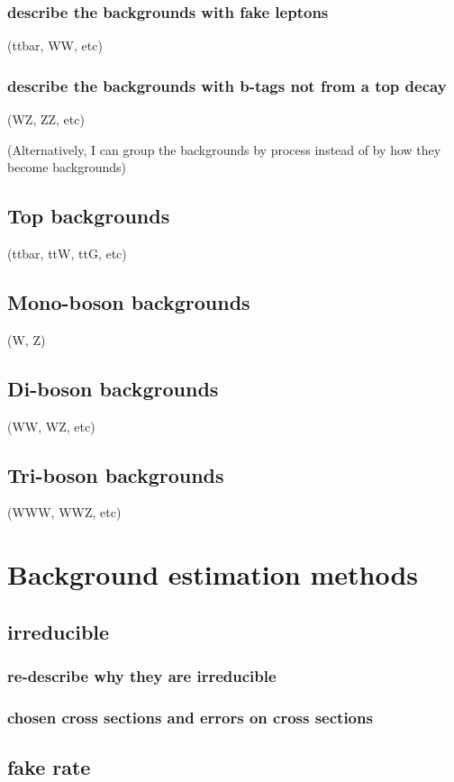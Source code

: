 \documentclass[12pt,chapterheads,oneside]{ucsd}
\begin{document}
        		\subsection{describe the backgrounds with fake leptons} 
			(ttbar, WW, etc)
        		\subsection{describe the backgrounds with b-tags not from a top decay} 
			(WZ, ZZ, etc)

(Alternatively, I can group the backgrounds by process instead of by how they become backgrounds)
	\section{Top backgrounds} (ttbar, ttW, ttG, etc)
	\section{Mono-boson backgrounds} (W, Z)
	\section{Di-boson backgrounds} (WW, WZ, etc)
	\section{Tri-boson backgrounds} (WWW, WWZ, etc)


	


\chapter{Background estimation methods}
	\section{irreducible}
        		\subsection{re-describe why they are irreducible}
        		\subsection{chosen cross sections and errors on cross sections}
	\section{fake rate}
\end{document}
